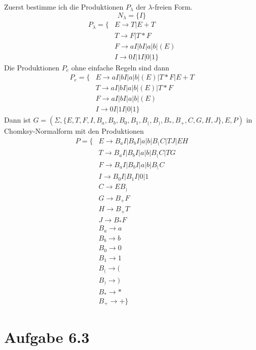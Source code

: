 \documentclass[10pt,a4paper]{article}
\begin{document}
Zuerst bestimme ich die Produktionen $P_{\lambda}$ der $\lambda$-freien Form.
\begin{equation}
  N_{\lambda} = \{ I \}
\end{equation}
\begin{align*}
  P_{\lambda} = \{ & E \rightarrow T | E + T\\
  & T \rightarrow F | T * F\\
  & F \rightarrow aI | bI | a | b | (E)\\
  & I \rightarrow 0I | 1I | 0 | 1 \}
\end{align*}
Die Produktionen $P_{e}$ ohne einfache Regeln sind dann
\begin{align*}
  P_{e} = \{ & E \rightarrow aI | bI | a | b | (E) | T * F | E + T\\
  & T \rightarrow aI | bI | a | b | (E) | T * F\\
  & F \rightarrow aI | bI | a | b | (E)\\
  & I \rightarrow 0I | 1I | 0 | 1 \}
\end{align*}
Dann ist $G = (\Sigma, \{ E, T, F, I, B_{a}, B_{b}, B_{0}, B_{1}, B_{(}, B_{)}, B_{*}, B_{+}, C, G, H, J \}, E, P)$ in Chomksy-Normalform mit den Produktionen
\begin{align*}
  P = \{ & E \rightarrow B_{a}I | B_{b}I | a | b | B_{(}C | TJ | EH\\
  & T \rightarrow B_{a}I | B_{b}I | a | b | B_{(}C | TG\\
  & F \rightarrow B_{a}I | B_{b}I | a | b | B_{(}C\\
  & I \rightarrow B_{0}I | B_{1}I | 0 | 1\\
  & C \rightarrow EB_{)}\\
  & G \rightarrow B_{+}F\\
  & H \rightarrow B_{+}T\\
  & J \rightarrow B_{*}F\\
  & B_{a} \rightarrow a\\
  & B_{b} \rightarrow b\\
  & B_{0} \rightarrow 0\\
  & B_{1} \rightarrow 1\\
  & B_{(} \rightarrow (\\
  & B_{)} \rightarrow )\\
  & B_{*} \rightarrow *\\
  & B_{+} \rightarrow +\}
\end{align*}

\section{Aufgabe 6.3}
\end{document}
